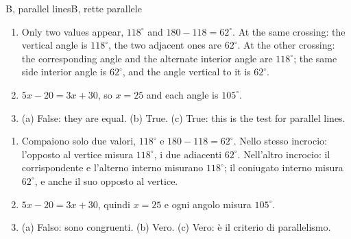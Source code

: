 \documentclass[10pt,a4paper,oneside]{book}
\begin{document}
\begin{solution}{B, parallel lines}{B, rette parallele}
\begin{enumerate}[label=\textbf{B\arabic*.}, leftmargin=2.2em]
\item Only two values appear, $118^\circ$ and $180 - 118 = 62^\circ$. At the same crossing: the vertical angle is $118^\circ$, the two adjacent ones are $62^\circ$. At the other crossing: the corresponding angle and the alternate interior angle are $118^\circ$; the same side interior angle is $62^\circ$, and the angle vertical to it is $62^\circ$.
\item $5x - 20 = 3x + 30$, so $x = 25$ and each angle is $105^\circ$.
\item (a) False: they are equal. (b) True. (c) True: this is the test for parallel lines.
\end{enumerate}
\tcblower
\begin{enumerate}[label=\textbf{B\arabic*.}, leftmargin=2.2em]
\item Compaiono solo due valori, $118^\circ$ e $180 - 118 = 62^\circ$. Nello stesso incrocio: l'opposto al vertice misura $118^\circ$, i due adiacenti $62^\circ$. Nell'altro incrocio: il corrispondente e l'alterno interno misurano $118^\circ$; il coniugato interno misura $62^\circ$, e anche il suo opposto al vertice.
\item $5x - 20 = 3x + 30$, quindi $x = 25$ e ogni angolo misura $105^\circ$.
\item (a) Falso: sono congruenti. (b) Vero. (c) Vero: è il criterio di parallelismo.
\end{enumerate}
\end{solution}
\end{document}
